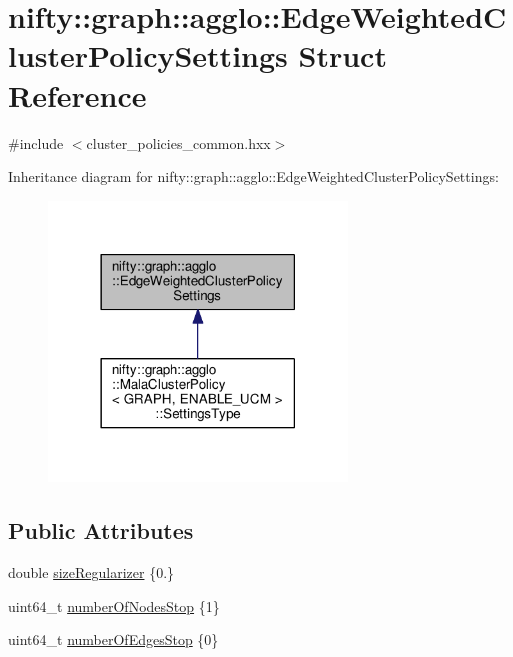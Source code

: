 \hypertarget{structnifty_1_1graph_1_1agglo_1_1EdgeWeightedClusterPolicySettings}{}\section{nifty\+:\+:graph\+:\+:agglo\+:\+:Edge\+Weighted\+Cluster\+Policy\+Settings Struct Reference}
\label{structnifty_1_1graph_1_1agglo_1_1EdgeWeightedClusterPolicySettings}


{\ttfamily \#include $<$cluster\+\_\+policies\+\_\+common.\+hxx$>$}



Inheritance diagram for nifty\+:\+:graph\+:\+:agglo\+:\+:Edge\+Weighted\+Cluster\+Policy\+Settings\+:\nopagebreak
\begin{figure}[H]
\begin{center}
\leavevmode
\includegraphics[width=225pt]{structnifty_1_1graph_1_1agglo_1_1EdgeWeightedClusterPolicySettings__inherit__graph}
\end{center}
\end{figure}
\subsection*{Public Attributes}
\begin{DoxyCompactItemize}
\item 
double \hyperlink{structnifty_1_1graph_1_1agglo_1_1EdgeWeightedClusterPolicySettings_a16830167af377ff60fd7831c4ca30074}{size\+Regularizer} \{0.\}
\item 
uint64\+\_\+t \hyperlink{structnifty_1_1graph_1_1agglo_1_1EdgeWeightedClusterPolicySettings_a09a8f5ef7a4a14304439367054bf64cc}{number\+Of\+Nodes\+Stop} \{1\}
\item 
uint64\+\_\+t \hyperlink{structnifty_1_1graph_1_1agglo_1_1EdgeWeightedClusterPolicySettings_a34f45712a326b7e635a6ec6419bfe42b}{number\+Of\+Edges\+Stop} \{0\}
\end{DoxyCompactItemize}


